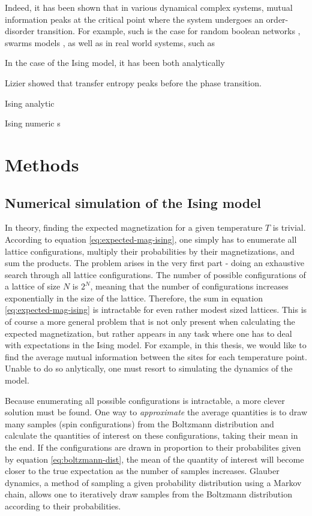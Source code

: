 \documentclass[12pt]{article}
\begin{document}
Indeed, it has been shown that in various dynamical complex systems, mutual information peaks at the critical point where the system undergoes an order-disorder transition. For example, such is the case for random boolean networks \cite{lizier-rand-bool-nets}, swarms models \cite{mi-swarms}, as well as in real world systems, such as \cite{mi-financial-markets}

In the case of the Ising model, it has been both analytically 

Lizier showed that transfer entropy peaks before the phase transition. \cite{barnett-ising}

Ising analytic \cite{mi-ising-analytic}

Ising numeric \cite{mi-ising-numeric}s

\newpage
\section{Methods}

\subsection{Numerical simulation of the Ising model}

In theory, finding the expected magnetization for a given temperature $T$ is trivial. According to equation \ref{eq:expected-mag-ising}, one simply has to enumerate all lattice configurations, multiply their probabilities by their magnetizations, and sum the products. The problem arises in the very first part - doing an exhaustive search through all lattice configurations. The number of possible configurations of a lattice of size $N$ is $2^N$, meaning that the number of configurations increases exponentially in the size of the lattice. Therefore, the sum in equation \ref{eq:expected-mag-ising} is intractable for even rather modest sized lattices. This is of course a more general problem that is not only present when calculating the expected magnetization, but rather appears in any task where one has to deal with expectations in the Ising model. For example, in this thesis, we would like to find the average mutual information between the sites for each temperature point. Unable to do so anlytically, one must resort to simulating the dynamics of the model. 

Because enumerating all possible configurations is intractable, a more clever solution must be found. One way to \textit{approximate} the average quantities is to draw many samples (spin configurations) from the Boltzmann distribution and calculate the quantities of interest on these configurations, taking their mean in the end. If the configurations are drawn in proportion to their probabilites given by equation \ref{eq:boltzmann-dist}, the mean of the quantity of interest will become closer to the true expectation as the number of samples increases. Glauber dynamics, a method of sampling a given probability distribution using a Markov chain, allows one to iteratively draw samples from the Boltzmann distribution according to their probabilities.
\end{document}
